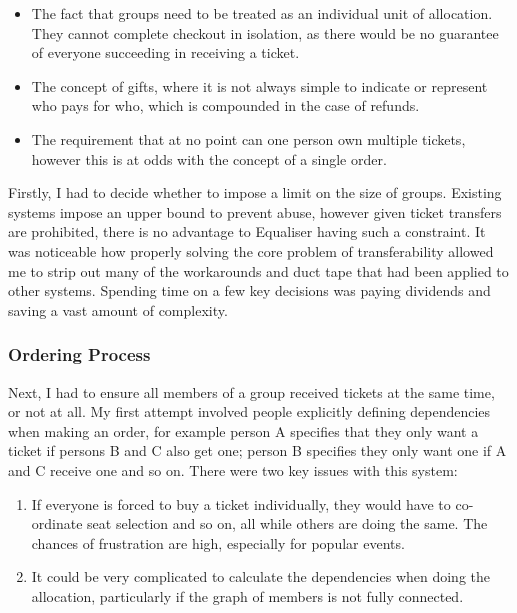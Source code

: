 \documentclass[12pt,a4paper]{bhamdissertation}
\begin{document}
\begin{itemize}
    \item The fact that groups need to be treated as an individual unit of allocation. They cannot complete checkout in isolation, as there would be no guarantee of everyone succeeding in receiving a ticket.
    \item The concept of gifts, where it is not always simple to indicate or represent who pays for who, which is compounded in the case of refunds.
    \item The requirement that at no point can one person own multiple tickets, however this is at odds with the concept of a single order.
\end{itemize}

Firstly, I had to decide whether to impose a limit on the size of groups. Existing systems impose an upper bound to prevent abuse, however given ticket transfers are prohibited, there is no advantage to Equaliser having such a constraint. It was noticeable how properly solving the core problem of transferability allowed me to strip out many of the workarounds and duct tape that had been applied to other systems. Spending time on a few key decisions was paying dividends and saving a vast amount of complexity.

\subsubsection{Ordering Process}

Next, I had to ensure all members of a group received tickets at the same time, or not at all. My first attempt involved people explicitly defining dependencies when making an order, for example person A specifies that they only want a ticket if persons B and C also get one; person B specifies they only want one if A and C receive one and so on. There were two key issues with this system:

\begin{enumerate}
    \item If everyone is forced to buy a ticket individually, they would have to co-ordinate seat selection and so on, all while others are doing the same. The chances of frustration are high, especially for popular events.
    \item It could be very complicated to calculate the dependencies when doing the allocation, particularly if the graph of members is not fully connected.
\end{enumerate}
\end{document}
